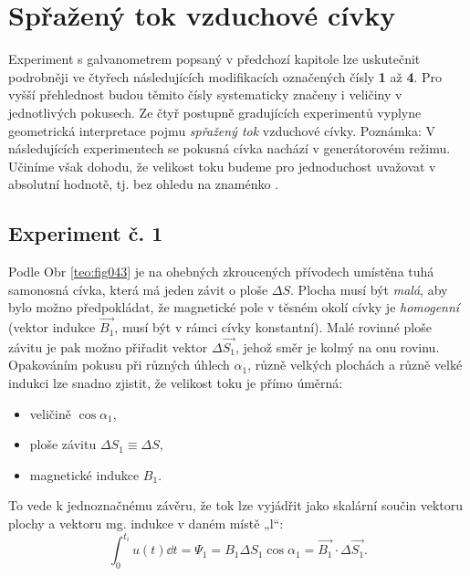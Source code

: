     \section{Spřažený tok vzduchové cívky}\label{ES:sec02}
      Experiment s galvanometrem popsaný v předchozí kapitole lze uskutečnit podrobněji ve čtyřech
      následujících modifikacích označených čísly \textbf{1} až \textbf{4}. Pro vyšší přehlednost
      budou těmito čísly systematicky značeny i veličiny v jednotlivých pokusech. Ze čtyř postupně
      gradujících experimentů vyplyne geometrická interpretace pojmu \emph{spřažený tok} vzduchové
      cívky. Poznámka: V následujících experimentech se pokusná  cívka nachází v generátorovém
      režimu. Učiníme však dohodu, že velikost toku budeme pro jednoduchost uvažovat v absolutní
      hodnotě, tj. bez ohledu na znaménko \cite[s.~12]{Patocka4}.

      \subsection{Experiment č. 1}
        Podle Obr \ref{teo:fig043} je na ohebných zkroucených přívodech umístěna tuhá samonosná
        cívka, která má jeden závit o ploše \(\Delta S\). Plocha musí být \emph{malá}, aby bylo
        možno předpokládat, že magnetické pole v těsném okolí cívky je \emph{homogenní} (vektor
        indukce \(\vec{B_1}\), musí být v rámci cívky konstantní). Malé rovinné ploše závitu je pak
        možno přiřadit vektor \(\Delta\vec{S_1}\), jehož směr je kolmý na onu rovinu. Opakováním
        pokusu při různých úhlech \(\alpha_1\), různě velkých plochách a různě velké indukci lze
        snadno zjistit, že velikost toku je přímo úměrná:


        \begin{itemize}[noitemsep]
          \item veličině \(\cos\alpha_1\),
          \item ploše závitu \(\Delta S_1 \equiv \Delta S\),
          \item magnetické indukce \(B_1\).
        \end{itemize}
        To vede k jednoznačnému závěru, že tok lze vyjádřit jako skalární součin vektoru plochy a
        vektoru mg. indukce v daném místě „l“:
        \begin{equation*}
          \int_0^{t_i} u(t)\dd{t} = \Psi_1 
                                  = B_1\Delta S_1\cos\alpha_1 = \vec{B_1}\cdot\Delta\vec{S_1}.
        \end{equation*}  
     
